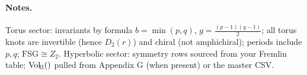 \documentclass[a4paper,11pt]{article}
\newcommand{\VolH}[1]{\operatorname{Vol}_{\!\mathbb{H}}(#1)}
\begin{document}
\paragraph{Notes.}
Torus sector: invariants by formula $b=\min(p,q)$, $g=\frac{(p-1)(q-1)}{2}$; all torus knots are invertible (hence $D_2(r)$) and chiral (not amphichiral); periods include $p,q$; $\mathrm{FSG}\cong Z_2$. 
Hyperbolic sector: symmetry rows sourced from your Fremlin table; $\VolH$ pulled from Appendix G (when present) or the master CSV.
\end{document}
